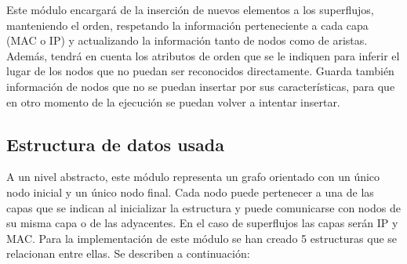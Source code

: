 \documentclass[twoside, 12pt]{epstfg}
\begin{document}
Este módulo encargará de la inserción de nuevos elementos a los superflujos, manteniendo el orden, respetando la información perteneciente a cada capa (MAC o IP) y actualizando la información tanto de nodos como de aristas. Además, tendrá en cuenta los atributos de orden que se le indiquen para inferir el lugar de los nodos que no puedan ser reconocidos directamente. Guarda también información de nodos que no se puedan insertar por sus características, para que en otro momento de la ejecución se puedan volver a intentar insertar.

\subsection{Estructura de datos usada}
A un nivel abstracto, este módulo representa un grafo orientado con un único nodo inicial y un único nodo final. Cada nodo puede pertenecer a una de las capas que se indican al inicializar la estructura y puede comunicarse con nodos de su misma capa o de las adyacentes. En el caso de superflujos las capas serán IP y MAC. Para la implementación de este módulo se han creado 5 estructuras que se relacionan entre ellas. Se describen a continuación:
\end{document}
